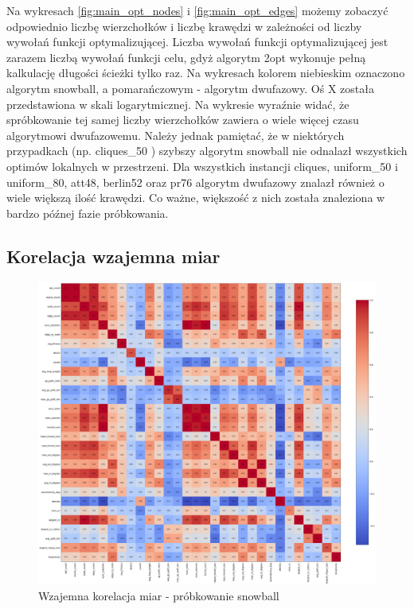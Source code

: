 Na wykresach \ref{fig:main_opt_nodes} i \ref{fig:main_opt_edges} możemy zobaczyć odpowiednio liczbę wierzchołków i liczbę krawędzi
w zależności od liczby wywołań funkcji optymalizującej. Liczba wywołań funkcji optymalizującej jest zarazem liczbą wywołań funkcji celu, gdyż
algorytm 2opt wykonuje pełną kalkulację długości ścieżki tylko raz.
Na wykresach kolorem niebieskim oznaczono algorytm snowball, a pomarańczowym - algorytm dwufazowy.
Oś X została przedstawiona w skali logarytmicznej.
Na wykresie wyraźnie widać, że spróbkowanie tej samej liczby wierzchołków zawiera o wiele więcej czasu algorytmowi dwufazowemu.
Należy jednak pamiętać, że w niektórych przypadkach (np. cliques\_50 ) szybszy algorytm snowball nie odnalazł wszystkich optimów lokalnych w przestrzeni.
Dla wszystkich instancji cliques, uniform\_50 i uniform\_80, att48, berlin52 oraz pr76 algorytm dwufazowy znalazł również o wiele większą ilość krawędzi.
Co ważne, większość z nich została znaleziona w bardzo późnej fazie próbkowania.

\subsection{Korelacja wzajemna miar}

\begin{figure}[h!]
    \centering
    \includegraphics[width=\textwidth]{chapters/experiments/img/snowball_corr.png}
    \caption{Wzajemna korelacja miar - próbkowanie snowball}
    \label{fig:corr_snowball}
\end{figure}

